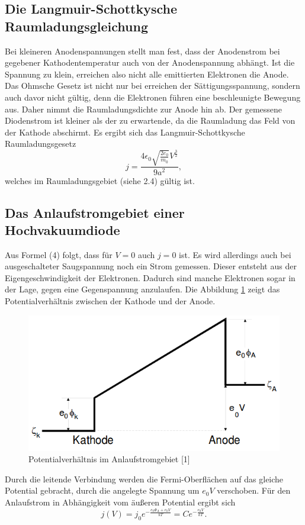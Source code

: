 \documentclass[11pt,ngerman,a4paper]{article}
\begin{document}
\subsection{Die Langmuir-Schottkysche Raumladungsgleichung}
Bei kleineren Anodenspannungen stellt man fest, dass der Anodenstrom bei gegebener Kathodentemperatur auch von der Anodenspannung abhängt. Ist die Spannung zu klein, erreichen also nicht alle emittierten Elektronen die Anode. Das Ohmsche Gesetz ist nicht nur bei erreichen der Sättigungsspannung, sondern auch davor nicht gültig, denn die Elektronen führen eine beschleunigte Bewegung aus. Daher nimmt die Raumladungsdichte zur Anode hin ab. Der gemessene Diodenstrom ist kleiner als der zu erwartende, da die Raumladung das Feld von der Kathode abschirmt. Es ergibt sich das Langmuir-Schottkysche Raumladungsgesetz
\begin{equation}
j = \frac{4 \epsilon_0 \sqrt{\frac{2 e_0}{m_0}} V^{\frac{3}{2}}}{9a^2},
\end{equation}
welches im Raumladungsgebiet (siehe 2.4) gültig ist.
\subsection{Das Anlaufstromgebiet einer Hochvakuumdiode}
Aus Formel (4) folgt, dass für $V=0$ auch $j=0$ ist. Es wird allerdings auch bei ausgeschalteter Saugspannung noch ein Strom gemessen. Dieser entsteht aus der Eigengeschwindigkeit der Elektronen. Dadurch sind manche Elektronen sogar in der Lage, gegen eine Gegenspannung anzulaufen. Die Abbildung \ref{funktion2} zeigt das Potentialverhältnis zwischen der Kathode und der Anode.
\begin{figure}[H]
\centering
\includegraphics[scale=0.5]{abb2.png}
\caption{Potentialverhältnis im Anlaufstromgebiet [1]}
\label{funktion2}
\end{figure}
Durch die leitende Verbindung werden die Fermi-Oberflächen auf das gleiche Potential gebracht, durch die angelegte Spannung um $e_0 V$ verschoben. Für den Anlaufstrom in Abhängigkeit vom äußeren Potential ergibt sich
\begin{equation}
j(V) = j_0 e^{-\frac{e_0 \Phi_A + e_0 V}{k T}} = C e^{-\frac{e_0 V}{k T}}.
\end{equation}
\end{document}
